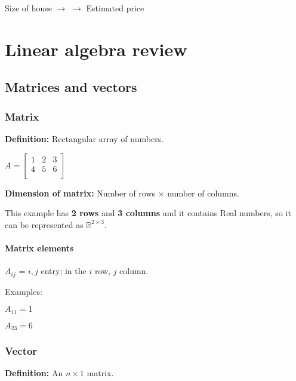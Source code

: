 \documentclass[a4paper]{report}
\begin{document}
       \par
       \par

      Size of house $\rightarrow$  $\rightarrow$ Estimated
      price

  \chapter{Linear algebra review}

    \section{Matrices and vectors}

      \subsection{Matrix}

        \textbf{Definition:} Rectangular array of numbers.

        $A =
        \begin{bmatrix}
          1 & 2 & 3 \\
          4 & 5 & 6 \\
        \end{bmatrix}$

        \textbf{Dimension of matrix:} Number of rows $\times$ number of columns.
        
        This example has \textbf{2 rows} and \textbf{3 columns} and it contains
        Real numbers, so it can be represented as $\mathbb{R}^{2\times3}$.

      \subsubsection{Matrix elements}

        $A_{ij}$ = $i,j$ entry; in the $i$ row, $j$ column.

        Examples:

        $A_{11} = 1$
        
        $A_{23} = 6$

      \subsection{Vector}

        \textbf{Definition:} An $n \times 1$ matrix.
\end{document}
